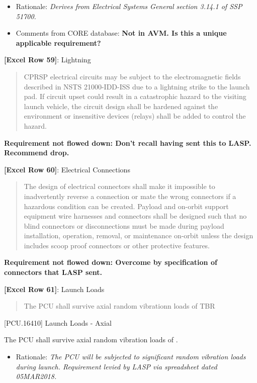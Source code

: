 \begin{itemize}
\item{} Rationale: \emph{Derives from Electrical Systems General section 3.14.1 of SSP 51700.}

\item{} Comments from CORE database: \textbf{Not in AVM. Is this a unique applicable requirement?}

\end{itemize}

\textbf{[Excel Row 59]}: Lightning

\begin{quote}
CPRSP electrical circuits may be subject to the electromagnetic fields described in NSTS 21000-IDD-ISS due to a lightning strike to the launch pad. If circuit upset could result in a catastrophic hazard to the visiting launch vehicle, the circuit design shall be hardened against the environment or insensitive devices (relays) shall be added to control the hazard.
\end{quote}

\textbf{Requirement not flowed down: Don’t recall having sent this to LASP. Recommend drop.}

\textbf{[Excel Row 60]}: Electrical Connections

\begin{quote}
The design of electrical connectors shall make it impossible to inadvertently reverse a connection or mate the wrong connectors if a hazardous condition can be created. Payload and on-orbit support equipment wire harnesses and connectors shall be designed such that no blind connectors or disconnections must be made during payload installation, operation, removal, or maintenance on-orbit unless the design includes scoop proof connectors or other protective features.
\end{quote}

\textbf{Requirement not flowed down: Overcome by specification of connectors that LASP sent.}

\textbf{[Excel Row 61]}: Launch Loads

\begin{quote}
The PCU shall survive axial random vibrationn loads of TBR
\end{quote}

[PCU.16410] Launch Loads - Axial

The PCU shall survive axial random vibration loads of .

\begin{itemize}
\item{} Rationale: \emph{The PCU will be subjected to significant random vibration loads during launch. Requirement levied by LASP via spreadsheet dated 05MAR2018.}

\end{itemize}

